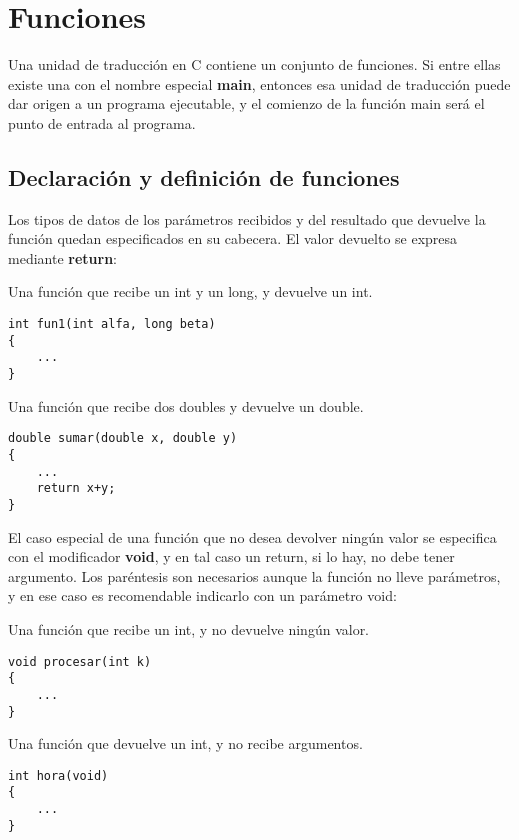 



\chapter{Funciones}
\label{sec:tc-funciones}
Una unidad de traducción en C contiene un conjunto de funciones. Si entre ellas
existe una con el nombre especial \textbf{main}, entonces esa unidad de traducción puede
dar origen a un programa ejecutable, y el comienzo de la función main será el
punto de entrada al programa.

\section{Declaración y definición de funciones} 

Los tipos de datos de los parámetros recibidos y del resultado que devuelve la
función quedan especificados en su cabecera. El valor devuelto se expresa
mediante \textbf{return}:

\begin{ejemplo}
Una función que recibe un int y un long, y devuelve un int.
\begin{lstlisting}
int fun1(int alfa, long beta)
{
	...
}	
\end{lstlisting}

Una función que recibe dos doubles y devuelve un double.
\begin{lstlisting}
double sumar(double x, double y)
{
	...
	return x+y;
}	
\end{lstlisting}
\end{ejemplo}

El caso especial de una función que no desea devolver ningún valor se
especifica con el modificador \textbf{void}, y en tal caso un return, si lo hay, no debe
tener argumento. Los paréntesis son necesarios aunque la función no lleve
parámetros, y en ese caso es recomendable indicarlo con un parámetro void:

\begin{ejemplo}
Una función que recibe un int, y no devuelve ningún valor.
\begin{lstlisting}
void procesar(int k)
{
	...
}	
\end{lstlisting}

Una función que devuelve un int, y no recibe argumentos.
\begin{lstlisting}
int hora(void)
{
	...
}	
\end{lstlisting}
\end{ejemplo}

